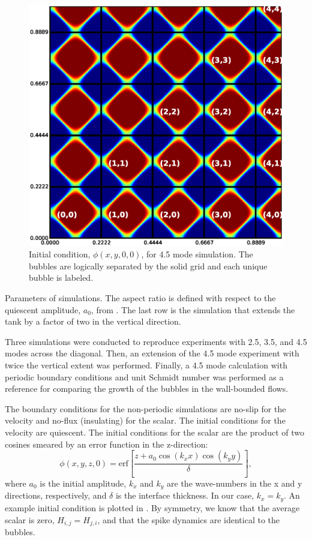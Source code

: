 \begin{figure}
\includegraphics[width=\columnwidth]{figs/cells}
\caption{  
Initial condition, $\phi(x,y,0,0)$, for 4.5 mode simulation.  
The bubbles are logically separated by the solid grid and each unique bubble is labeled.
}
\end{figure}

\begin{table}

\caption{ 
Parameters of simulations.
The aspect ratio is defined with respect to the quiescent amplitude, $a_0$, from .
The last row is the simulation that extends the tank by a factor of two in the vertical direction.
}
\end{table}

Three simulations were conducted to reproduce experiments with 2.5, 3.5, and 4.5 modes across the diagonal.
Then, an extension of the 4.5 mode experiment with twice the vertical extent was performed.
Finally, a 4.5 mode calculation with periodic boundary conditions and unit Schmidt number was performed as a reference for comparing the growth of the bubbles in the wall-bounded flows.

The boundary conditions for the non-periodic simulations are no-slip for the velocity and no-flux (insulating) for the scalar.
The initial conditions for the velocity are quiescent.
The initial conditions for the scalar are the product of two cosines smeared by an error function in the z-direction:
\begin{equation}
  \phi(x,y,z,0) = \text{erf}\left[ \frac{z + a_0 \cos(k_x x) \cos(k_y y)}{\delta} \right] ,
\end{equation}
where $a_0$ is the initial amplitude,
$k_x$ and $k_y$ are the wave-numbers in the x and y directions, respectively, and
$\delta$ is the interface thickness.
In our case, $k_x = k_y$.
An example initial condition is plotted in .
By symmetry, we know that the average scalar is zero, $H_{i,j} = H_{j,i}$, and that the spike dynamics are identical to the bubbles.

